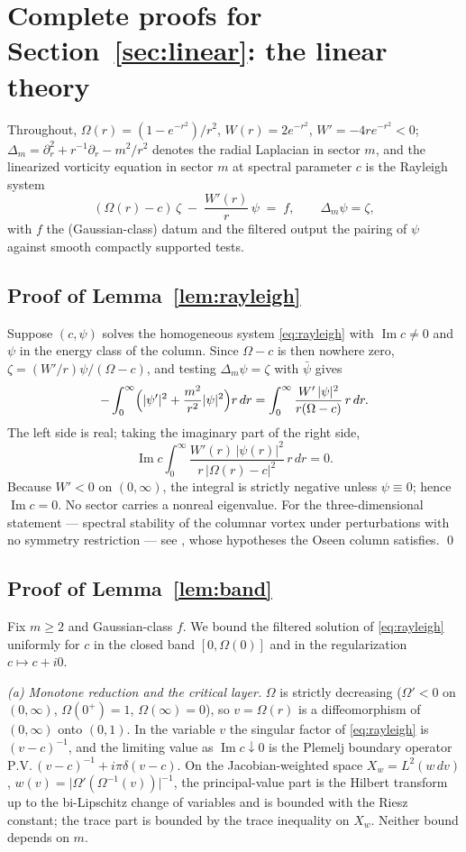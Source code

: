 \documentclass[11pt,letterpaper]{amsart}
\theoremstyle{definition}
\theoremstyle{remark}
\newcommand{\abs}[1]{\lvert #1 \rvert}
\begin{document}
\section{Complete proofs for Section~\ref{sec:linear}: the linear theory}\label{pfsec:linear}

Throughout, $\Omega(r)=(1-e^{-r^2})/r^2$, $W(r)=2e^{-r^2}$, $W'=-4re^{-r^2}<0$;
$\Delta_m=\partial_r^2+r^{-1}\partial_r-m^2/r^2$ denotes the radial Laplacian in sector
$m$, and the linearized vorticity equation in sector $m$ at spectral parameter $c$ is
the Rayleigh system
\begin{equation}\label{eq:rayleigh}
(\Omega(r)-c)\,\zeta \;-\; \frac{W'(r)}{r}\,\psi \;=\; f,
\qquad \Delta_m\psi=\zeta,
\end{equation}
with $f$ the (Gaussian-class) datum and the filtered output the pairing of $\psi$
against smooth compactly supported tests.

\subsection{Proof of Lemma~\ref{lem:rayleigh}}\label{pf:rayleigh}
Suppose $(c,\psi)$ solves the homogeneous system \eqref{eq:rayleigh} with
$\operatorname{Im}c\neq0$ and $\psi$ in the energy class of the column. Since
$\Omega-c$ is then nowhere zero, $\zeta=(W'/r)\psi/(\Omega-c)$, and testing
$\Delta_m\psi=\zeta$ with $\bar\psi$ gives
\[
-\int_0^\infty\Bigl(|\psi'|^2+\frac{m^2}{r^2}|\psi|^2\Bigr)r\,dr
=\int_0^\infty\frac{W'\,|\psi|^2}{r(\Omega-c)}\,r\,dr .
\]
The left side is real; taking the imaginary part of the right side,
\[
\operatorname{Im}c\int_0^\infty\frac{W'(r)\,|\psi(r)|^2}{r\,\abs{\Omega(r)-c}^2}\,r\,dr=0 .
\]
Because $W'<0$ on $(0,\infty)$, the integral is strictly negative unless $\psi\equiv0$;
hence $\operatorname{Im}c=0$. No sector carries a nonreal eigenvalue. For the
three-dimensional statement --- spectral stability of the columnar vortex under
perturbations with no symmetry restriction --- see \cite{GallaySmets2020}, whose
hypotheses the Oseen column satisfies. \qed

\subsection{Proof of Lemma~\ref{lem:band}}\label{pf:band}
Fix $m\ge2$ and Gaussian-class $f$. We bound the filtered solution of
\eqref{eq:rayleigh} uniformly for $c$ in the closed band $[0,\Omega(0)]$ and in the
regularization $c\mapsto c+i0$.

\emph{(a) Monotone reduction and the critical layer.} $\Omega$ is strictly decreasing
($\Omega'<0$ on $(0,\infty)$, $\Omega(0^+)=1$, $\Omega(\infty)=0$), so $v=\Omega(r)$ is
a diffeomorphism of $(0,\infty)$ onto $(0,1)$. In the variable $v$ the singular factor
of \eqref{eq:rayleigh} is $(v-c)^{-1}$, and the limiting value as
$\operatorname{Im}c\downarrow0$ is the Plemelj boundary operator
$\mathrm{P.V.}\,(v-c)^{-1}+i\pi\delta(v-c)$. On the Jacobian-weighted space
$X_w=L^2(w\,dv)$, $w(v)=\abs{\Omega'(\Omega^{-1}(v))}^{-1}$, the principal-value part
is the Hilbert transform up to the bi-Lipschitz change of variables and is bounded
with the Riesz constant; the trace part is bounded by the trace inequality on $X_w$.
Neither bound depends on $m$.
\end{document}
